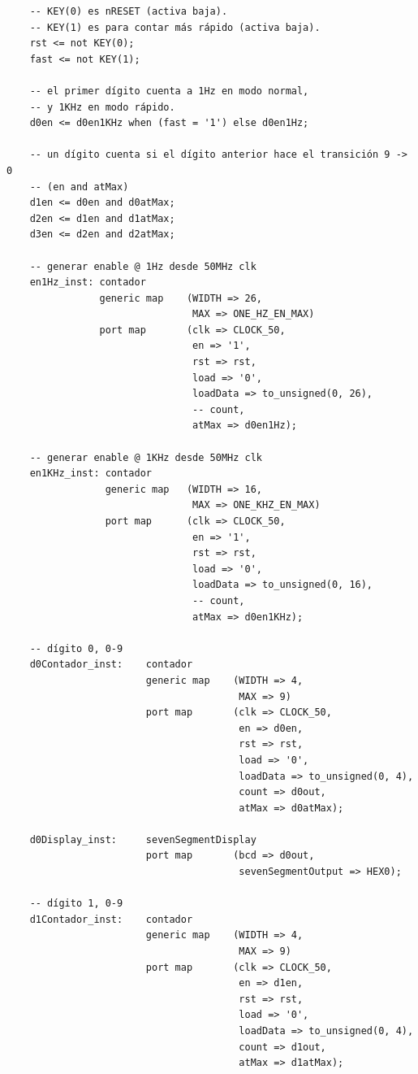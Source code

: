 \documentclass[a4paper]{article}
\begin{document}
\begin{verbatim}
    -- KEY(0) es nRESET (activa baja).
    -- KEY(1) es para contar más rápido (activa baja).
    rst <= not KEY(0);
    fast <= not KEY(1);

    -- el primer dígito cuenta a 1Hz en modo normal,
    -- y 1KHz en modo rápido.
    d0en <= d0en1KHz when (fast = '1') else d0en1Hz;

    -- un dígito cuenta si el dígito anterior hace el transición 9 -> 0
    -- (en and atMax)
    d1en <= d0en and d0atMax;
    d2en <= d1en and d1atMax;
    d3en <= d2en and d2atMax;

    -- generar enable @ 1Hz desde 50MHz clk
    en1Hz_inst: contador
                generic map    (WIDTH => 26,
                                MAX => ONE_HZ_EN_MAX)
                port map       (clk => CLOCK_50,
                                en => '1',
                                rst => rst,
                                load => '0',
                                loadData => to_unsigned(0, 26),
                                -- count,
                                atMax => d0en1Hz);

    -- generar enable @ 1KHz desde 50MHz clk
    en1KHz_inst: contador
                 generic map   (WIDTH => 16,
                                MAX => ONE_KHZ_EN_MAX)
                 port map      (clk => CLOCK_50,
                                en => '1',
                                rst => rst,
                                load => '0',
                                loadData => to_unsigned(0, 16),
                                -- count,
                                atMax => d0en1KHz);

    -- dígito 0, 0-9
    d0Contador_inst:    contador
                        generic map    (WIDTH => 4,
                                        MAX => 9)
                        port map       (clk => CLOCK_50,
                                        en => d0en,
                                        rst => rst,
                                        load => '0',
                                        loadData => to_unsigned(0, 4),
                                        count => d0out,
                                        atMax => d0atMax);

    d0Display_inst:     sevenSegmentDisplay
                        port map       (bcd => d0out,
                                        sevenSegmentOutput => HEX0);

    -- dígito 1, 0-9
    d1Contador_inst:    contador
                        generic map    (WIDTH => 4,
                                        MAX => 9)
                        port map       (clk => CLOCK_50,
                                        en => d1en,
                                        rst => rst,
                                        load => '0',
                                        loadData => to_unsigned(0, 4),
                                        count => d1out,
                                        atMax => d1atMax);


\end{verbatim}
\end{document}
